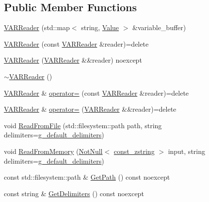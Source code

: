 \subsection*{Public Member Functions}
\begin{DoxyCompactItemize}
\item 
\mbox{\hyperlink{classmage_1_1loader_1_1_v_a_r_reader_ae06b2b97d9a0ce16047b0c8cfcd4a73f}{V\+A\+R\+Reader}} (std\+::map$<$ string, \mbox{\hyperlink{namespacemage_a5bc219b33037a43e23f59e4e8ddff10d}{Value}} $>$ \&variable\+\_\+buffer)
\item 
\mbox{\hyperlink{classmage_1_1loader_1_1_v_a_r_reader_ab4ab4d94c90a2797ae40e54e0dd7c127}{V\+A\+R\+Reader}} (const \mbox{\hyperlink{classmage_1_1loader_1_1_v_a_r_reader}{V\+A\+R\+Reader}} \&reader)=delete
\item 
\mbox{\hyperlink{classmage_1_1loader_1_1_v_a_r_reader_aeefac440730fc89b16afa19695c956d5}{V\+A\+R\+Reader}} (\mbox{\hyperlink{classmage_1_1loader_1_1_v_a_r_reader}{V\+A\+R\+Reader}} \&\&reader) noexcept
\item 
\mbox{\hyperlink{classmage_1_1loader_1_1_v_a_r_reader_acd3bbd51ccc774d2f74a4520b6143990}{$\sim$\+V\+A\+R\+Reader}} ()
\item 
\mbox{\hyperlink{classmage_1_1loader_1_1_v_a_r_reader}{V\+A\+R\+Reader}} \& \mbox{\hyperlink{classmage_1_1loader_1_1_v_a_r_reader_a78d39071ad5103c848782ff82be397bb}{operator=}} (const \mbox{\hyperlink{classmage_1_1loader_1_1_v_a_r_reader}{V\+A\+R\+Reader}} \&reader)=delete
\item 
\mbox{\hyperlink{classmage_1_1loader_1_1_v_a_r_reader}{V\+A\+R\+Reader}} \& \mbox{\hyperlink{classmage_1_1loader_1_1_v_a_r_reader_a0da01229f594cb701b3e20d53be9d16e}{operator=}} (\mbox{\hyperlink{classmage_1_1loader_1_1_v_a_r_reader}{V\+A\+R\+Reader}} \&\&reader)=delete
\item 
void \mbox{\hyperlink{classmage_1_1loader_1_1_v_a_r_reader_ad4236487534d5dba6582613317317092}{Read\+From\+File}} (std\+::filesystem\+::path path, string delimiters=\mbox{\hyperlink{namespacemage_aa161198415efd9349da6187663250aea}{g\+\_\+default\+\_\+delimiters}})
\item 
void \mbox{\hyperlink{classmage_1_1loader_1_1_v_a_r_reader_a5aa9068792817b6d6dc840a44b788159}{Read\+From\+Memory}} (\mbox{\hyperlink{namespacemage_a8769f9d670d6b585ea306cb1062af94b}{Not\+Null}}$<$ \mbox{\hyperlink{namespacemage_abfd9206dc607ceb5d13ec68bf075a5c0}{const\+\_\+zstring}} $>$ input, string delimiters=\mbox{\hyperlink{namespacemage_aa161198415efd9349da6187663250aea}{g\+\_\+default\+\_\+delimiters}})
\item 
const std\+::filesystem\+::path \& \mbox{\hyperlink{classmage_1_1loader_1_1_v_a_r_reader_a9740b3cecdcf5a27c696a08eef3b09da}{Get\+Path}} () const noexcept
\item 
const string \& \mbox{\hyperlink{classmage_1_1loader_1_1_v_a_r_reader_aa00e1e27b614e11ec9f70e52d0bac551}{Get\+Delimiters}} () const noexcept
\end{DoxyCompactItemize}
